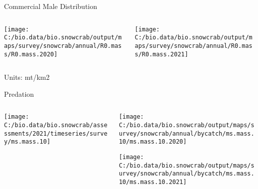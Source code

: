 \documentclass[
  ignorenonframetext,
]{beamer}
\begin{document}
\begin{frame}{Commercial Male Distribution}
\protect\hypertarget{commercial-male-distribution}{}
\begin{columns}[T]
\begin{column}{0.48\textwidth}
\begin{center}\texttt{[image: C:/bio.data/bio.snowcrab/output/maps/survey/snowcrab/annual/R0.mass/R0.mass.2020]} \end{center}
\end{column}

\begin{column}{0.48\textwidth}
\begin{center}\texttt{[image: C:/bio.data/bio.snowcrab/output/maps/survey/snowcrab/annual/R0.mass/R0.mass.2021]} \end{center}
\end{column}
\end{columns}

Units: mt/km2
\end{frame}

\begin{frame}{Predation}
\protect\hypertarget{predation}{}
\begin{columns}[T]
\begin{column}{0.48\textwidth}
\begin{center}\texttt{[image: C:/bio.data/bio.snowcrab/assessments/2021/timeseries/survey/ms.mass.10]} \end{center}
\end{column}

\begin{column}{0.48\textwidth}
\begin{center}\texttt{[image: C:/bio.data/bio.snowcrab/output/maps/survey/snowcrab/annual/bycatch/ms.mass.10/ms.mass.10.2020]} \end{center}

\begin{center}\texttt{[image: C:/bio.data/bio.snowcrab/output/maps/survey/snowcrab/annual/bycatch/ms.mass.10/ms.mass.10.2021]} \end{center}
\end{column}
\end{columns}
\end{frame}
\end{document}
